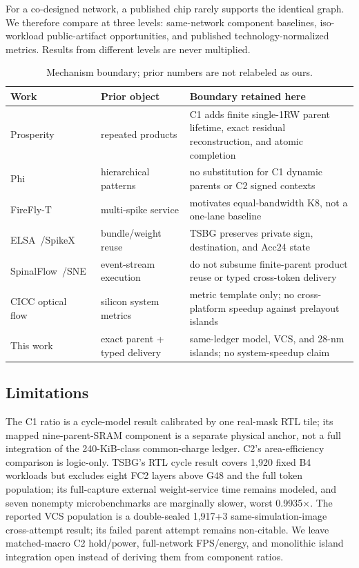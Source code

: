 \documentclass[conference]{IEEEtran}
\begin{document}
For a co-designed network, a published chip rarely supports the identical graph.
We therefore compare at three levels: same-network component baselines,
iso-workload public-artifact opportunities, and published technology-normalized
metrics.  Results from different levels are never multiplied.

\begin{table}[t]
\caption{Mechanism boundary; prior numbers are not relabeled as ours.}
\label{tab:prior}
\centering
\scriptsize
\begin{tabular}{@{}L{0.20\columnwidth}L{0.21\columnwidth}L{0.49\columnwidth}@{}}
\toprule
Work & Prior object & Boundary retained here \\
\midrule
Prosperity~\cite{prosperity} & repeated products & C1 adds finite single-1RW parent lifetime, exact residual reconstruction, and atomic completion \\
Phi~\cite{phi} & hierarchical patterns & no substitution for C1 dynamic parents or C2 signed contexts \\
FireFly-T~\cite{fireflyt} & multi-spike service & motivates equal-bandwidth K8, not a one-lane baseline \\
ELSA~\cite{elsa}/\allowbreak SpikeX~\cite{spikex} & bundle/weight reuse & TSBG preserves private sign, destination, and Acc24 state \\
SpinalFlow~\cite{spinalflow}/\allowbreak SNE~\cite{sne} & event-stream execution & do not subsume finite-parent product reuse or typed cross-token delivery \\
CICC optical flow~\cite{ciccflow} & silicon system metrics & metric template only; no cross-platform speedup against prelayout islands \\
This work & exact parent + typed delivery & same-ledger model, VCS, and 28-nm islands; no system-speedup claim \\
\bottomrule
\end{tabular}
\end{table}

\subsection{Limitations}
The C1 ratio is a cycle-model result calibrated by one real-mask RTL tile; its
mapped nine-parent-SRAM component is a separate physical anchor, not a full
integration of the 240-KiB-class common-charge ledger.  C2's area-efficiency
comparison is logic-only.  TSBG's RTL cycle result covers 1,920 fixed B4
workloads but excludes eight FC2 layers above G48 and the full token population;
its full-capture external weight-service time remains modeled, and seven
nonempty microbenchmarks are marginally slower, worst 0.9935$\times$.  The
reported VCS population is a double-sealed 1,917+3 same-simulation-image
cross-attempt result; its failed parent attempt remains non-citable.  We leave
matched-macro C2 hold/power, full-network FPS/energy, and monolithic island
integration open instead of deriving them from component ratios.
\end{document}
